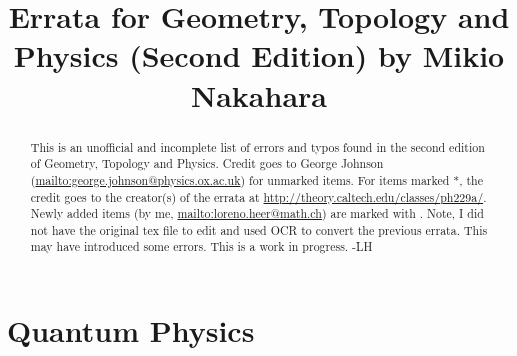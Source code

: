 \documentclass{article}
\title{Errata for Geometry, Topology and Physics (Second
  Edition) by Mikio Nakahara}
\begin{document}
\maketitle
\begin{abstract}This is an unofficial and incomplete list of errors and typos found in the second edition
of Geometry, Topology and Physics. Credit goes to George Johnson (\url{mailto:george.johnson@physics.ox.ac.uk}) for unmarked items.
For items marked *, the credit goes
to the creator(s) of the errata at \url{http://theory.caltech.edu/classes/ph229a/}.
Newly added items (by me, \url{mailto:loreno.heer@math.ch}) are marked with \dagger.
Note, I did not have the original tex file to edit and used OCR to convert the previous errata. This may
have introduced some errors. This is a work in progress. -LH
\end{abstract}
\section*{Quantum Physics}
\end{document}
